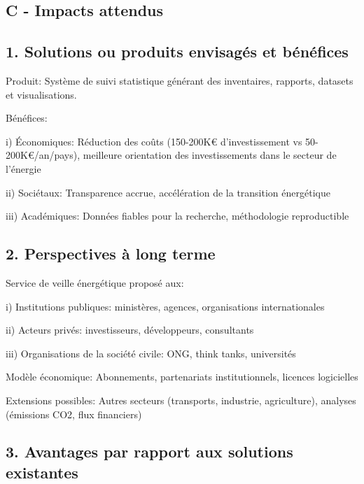 \documentclass[a4paper,11pt]{report}
\begin{document}
\subsection{C - Impacts attendus}\label{c---impacts-attendus}

\subsection{1. Solutions ou produits envisagés et bénéfices}\label{solutions-ou-produits-envisaguxe9s-et-buxe9nuxe9fices}

Produit: Système de suivi statistique générant des inventaires, rapports, datasets et visualisations.

Bénéfices:

i) Économiques: Réduction des coûts (150-200K€ d'investissement vs 50-200K€/an/pays), meilleure orientation des investissements dans le secteur de l'énergie

ii) Sociétaux: Transparence accrue, accélération de la transition énergétique

iii) Académiques: Données fiables pour la recherche, méthodologie reproductible

\subsection{2. Perspectives à long terme}\label{perspectives-uxe0-long-terme}

Service de veille énergétique proposé aux:

i) Institutions publiques: ministères, agences, organisations internationales

ii) Acteurs privés: investisseurs, développeurs, consultants

iii) Organisations de la société civile: ONG, think tanks, universités

Modèle économique: Abonnements, partenariats institutionnels, licences logicielles

Extensions possibles: Autres secteurs (transports, industrie, agriculture), analyses (émissions CO2, flux financiers)

\subsection{3. Avantages par rapport aux solutions existantes}\label{avantages-par-rapport-aux-solutions-existantes}
\end{document}
